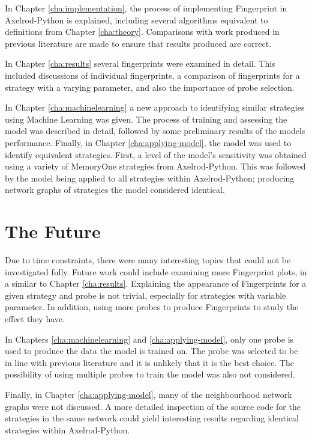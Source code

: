 In Chapter \ref{cha:implementation}, the process of implementing Fingerprint in Axelrod-Python is explained, including several algorithms equivalent to definitions from Chapter \ref{cha:theory}.
Comparisons with work produced in previous literature are made to ensure that results produced are correct.

In Chapter \ref{cha:results} several fingerprints were examined in detail.
This included discussions of individual fingerprints, a comparison of fingerprints for a strategy with a varying parameter, and also the importance of probe selection.

In Chapter \ref{cha:machinelearning} a new approach to identifying similar strategies using Machine Learning was given.
The process of training and assessing the model was described in detail, followed by some preliminary results of the models performance.
Finally, in Chapter \ref{cha:applying-model}, the model was used to identify equivalent strategies.
First, a level of the model's sensitivity was obtained using a variety of MemoryOne strategies from Axelrod-Python.
This was followed by the model being applied to all strategies within Axelrod-Python; producing network graphs of strategies the model considered identical.



\section{The Future}

Due to time constraints, there were many interesting topics that could not be investigated fully.
Future work could include examining more Fingerprint plots, in a similar to Chapter \ref{cha:results}.
Explaining the appearance of Fingerprints for a given strategy and probe is not trivial, especially for strategies with variable parameter.
In addition, using more probes to produce Fingerprints to study the effect they have.

In Chapters \ref{cha:machinelearning} and \ref{cha:applying-model}, only one probe is used to produce the data the model is trained on.
The probe was selected to be in line with previous literature and it is unlikely that it is the best choice.
The possibility of using multiple probes to train the model was also not considered.

Finally, in Chapter \ref{cha:applying-model}, many of the neighbourhood network graphs were not discussed.
A more detailed inspection of the source code for the strategies in the same network could yield interesting results regarding identical strategies within Axelrod-Python.
